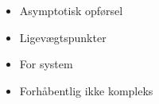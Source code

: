 \begin{itemize}
    \item Asymptotisk opførsel
    \item Ligevægtspunkter
    \item For system 
    \item Forhåbentlig ikke kompleks
\end{itemize}